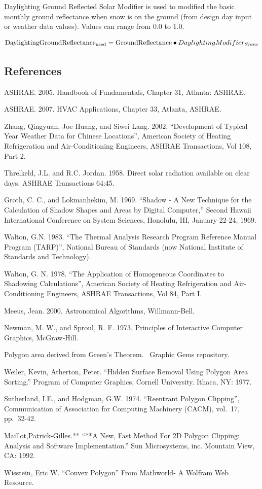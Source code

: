 Daylighting Ground Reflected Solar Modifier is used to modified the basic monthly ground reflectance when snow is on the ground (from design day input or weather data values). Values can range from 0.0 to 1.0.

\begin{equation}
{\rm{DaylightingGroundReflectanc}}{{\rm{e}}_{{\rm{used}}}} = {\rm{GroundReflectance}} \bullet DaylightingModifie{r_{Snow}}
\end{equation}

\subsection{References}\label{references-041}

ASHRAE. 2005. Handbook of Fundamentals, Chapter 31, Atlanta: ASHRAE.

ASHRAE. 2007. HVAC Applications, Chapter 33, Atlanta, ASHRAE.

Zhang, Qingyuan, Joe Huang, and Siwei Lang. 2002. ``Development of Typical Year Weather Data for Chinese Locations'', American Society of Heating Refrigeration and Air-Conditioning Engineers, ASHRAE Transactions, Vol 108, Part 2.

Threlkeld, J.L. and R.C. Jordan. 1958. Direct solar radiation available on clear days. ASHRAE Transactions 64:45.

Groth, C. C., and Lokmanhekim, M. 1969. ``Shadow ‑ A New Technique for the Calculation of Shadow Shapes and Areas by Digital Computer,'' Second Hawaii International Conference on System Sciences, Honolulu, HI, January 22‑24, 1969.

Walton, G.N. 1983. ``The Thermal Analysis Research Program Reference Manual Program (TARP)'', National Bureau of Standards (now National Institute of Standards and Technology).

Walton, G. N. 1978. ``The Application of Homogeneous Coordinates to Shadowing Calculations'', American Society of Heating Refrigeration and Air-Conditioning Engineers, ASHRAE Transactions, Vol 84, Part I.

Meeus, Jean. 2000. Astronomical Algorithms, Willmann-Bell.

Newman, M. W., and Sproul, R. F. 1973. Principles of Interactive Computer Graphics, McGraw‑Hill.

Polygon area derived from Green's Theorem.~ Graphic Gems repository.

Weiler, Kevin, Atherton, Peter. ``Hidden Surface Removal Using Polygon Area Sorting.'' Program of Computer Graphics, Cornell University. Ithaca, NY: 1977.

Sutherland, I.E., and Hodgman, G.W. 1974. ``Reentrant Polygon Clipping'', Communication of Association for Computing Machinery (CACM), vol.~17, pp.~32-42.

Maillot,Patrick-Gilles.** ``**A New, Fast Method For 2D Polygon Clipping: Analysis and Software Implementation.'' Sun Microsystems, inc. Mountain View, CA: 1992.

Wisstein, Eric W. ``Convex Polygon'' From Mathworld- A Wolfram Web Resource.
